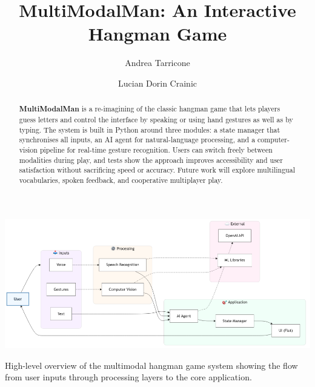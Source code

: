 \documentclass[nonacm,sigplan]{acmart}
\begin{document}
\title[]{MultiModalMan: An Interactive Hangman Game}

\author{Andrea Tarricone}

\author{Lucian Dorin Crainic}

\begin{abstract}
\textbf{MultiModalMan} is a re-imagining of the classic hangman game that lets players guess letters and control the interface by speaking or using hand gestures as well as by typing. The system is built in Python around three modules: a state manager that synchronises all inputs, an AI agent for natural-language processing, and a computer-vision pipeline for real-time gesture recognition. Users can switch freely between modalities during play, and tests show the approach improves accessibility and user satisfaction without sacrificing speed or accuracy. Future work will explore multilingual vocabularies, spoken feedback, and cooperative multiplayer play.
\end{abstract}


\begin{teaserfigure}
  \includegraphics[width=\textwidth]{./images/architecture_diagram.png}
  \caption{High-level overview of the multimodal hangman game system showing the flow from user inputs through processing layers to the core application.}
  \label{fig:teaser}
\end{teaserfigure}

\maketitle
\pagestyle{plain}




% 
% 
% 





\end{document}
